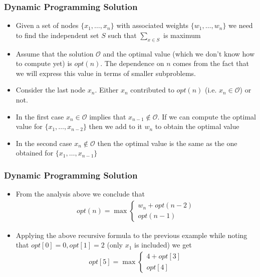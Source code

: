 \documentclass{beamer}
\begin{document}
\begin{frame}
  \frametitle{Dynamic Programming Solution}
  \begin{itemize}
  \item Given a set of nodes $\{x_1,\ldots,x_n\}$ with associated weights $\{w_1,\ldots,w_n\}$ we need to find the independent set $S$ such that $\sum_{x\in S}$ is maximum 
\item Assume that the solution $\mathcal{O}$ and the optimal value (which we don't know how to compute yet) is $opt(n)$. The dependence on $n$ comes from the fact that we will express this value in terms of smaller subproblems.
\item Consider the last node $x_n$. Either $x_n$ contributed to $opt(n)$ (i.e. $x_n\in\mathcal{O}$) or not.
\item In the first case $x_n\in\mathcal{O}$ implies that $x_{n-1}\notin\mathcal{O}$. If we can compute the optimal value for $\{x_1,\ldots,x_{n-2}\}$ then we add to it $w_n$ to obtain the optimal value
\item In the second case $x_n\notin\mathcal{O}$ then the optimal value is the same as the one obtained for $\{x_1,\ldots,x_{n-1}\}$
  \end{itemize}
\end{frame}


\begin{frame}
  \frametitle{Dynamic Programming Solution}
  \begin{itemize}
  \item From the analysis above we conclude that 
  \begin{align*}
    opt(n)=\max\left\{\begin{aligned}w_n+opt(n-2)\\opt(n-1) \end{aligned}  \right.
  \end{align*}
\item Applying the above recursive formula to the previous example while noting that $opt[0]=0,opt[1]=2$ (only $x_1$ is included) we get
  \begin{align*}
    opt[5]=\max\left\{\begin{aligned}4+opt[3]\\opt[4] \end{aligned}  \right.
  \end{align*}
  \end{itemize}
\end{frame}
\end{document}
